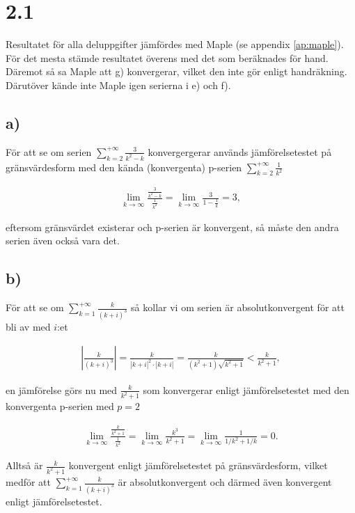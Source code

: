 \documentclass[a4paper]{article}
\begin{document}
\section*{2.1}

Resultatet för alla deluppgifter jämfördes med Maple (se appendix \ref{ap:maple}). För det mesta stämde resultatet överens med det som beräknades för hand. Däremot så sa Maple att g) konvergerar, vilket den inte gör enligt handräkning. Därutöver kände inte Maple igen serierna i e) och f).

\subsection*{a)}
För att se om serien $\sum_{k=2}^{+\infty}\frac{3}{k^2-k}$ konvergergerar
används jämförelsetestet på gränsvärdesform med den kända (konvergenta) p-serien
$\sum_{k=2}^{+\infty}\frac{1}{k^2}$

\begin{align*}
  \lim_{k\to\infty} \frac{\frac{3}{k^2-k}}{\frac{1}{k^2}} = \lim_{k\to\infty}
  \frac{3}{1 - \frac{1}{k}} = 3,
\end{align*}

\noindent eftersom gränsvärdet existerar och p-serien är konvergent, så måste den andra serien även också vara det.

\subsection*{b)}

För att se om $\sum_{k=1}^{+\infty}\frac{k}{(k+i)^3}$ så kollar vi om serien är
absolutkonvergent för att bli av med $i$:et

\begin{align*}
  \left|\frac{k}{(k+i)^3}\right| = \frac{k}{\left| k+i \right|^2\cdot\left| k + i \right|} = \frac{k}{(k^2+1)\sqrt{k^2+1}} < \frac{k}{k^2+1},
\end{align*}

\noindent en jämförelse görs nu med $\frac{k}{k^2+1}$ som konvergerar enligt
jämförelsetestet med den konvergenta p-serien med $p=2$

\begin{align*}
  \lim_{k\to\infty} \frac{\frac{k}{k^2+1}}{\frac{1}{k^2}} = \lim_{k\to\infty} \frac{k^3}{k^2+1} = \lim_{k\to\infty} \frac{1}{1/k^2 + 1/k} = 0.
\end{align*}

\noindent Alltså är $\frac{k}{k^2+1}$ konvergent enligt jämförelsetestet på
gränsvärdesform, vilket medför att $\sum_{k=1}^{+\infty}\frac{k}{(k+i)^3}$ är
absolutkonvergent och därmed även konvergent enligt jämförelsetestet.
\end{document}
